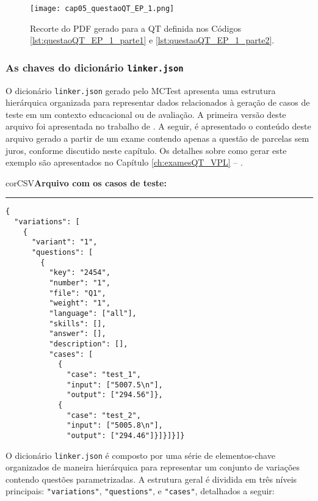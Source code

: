 \begin{figure}[!ht]
  \texttt{[image: cap05\_questaoQT\_EP\_1.png]}
  \caption{Recorte do PDF gerado para a QT definida nos Códigos \ref{lst:questaoQT_EP_1_parte1} e \ref{lst:questaoQT_EP_1_parte2}.}
  \label{fig:cap05_questaoQT_EP_1}
\end{figure}

\subsubsection{As chaves do dicionário \texttt{linker.json}} 


O dicionário \verb|linker.json| gerado pelo MCTest apresenta uma estrutura hierárquica organizada para representar dados relacionados à geração de casos de teste em um contexto educacional ou de avaliação. A primeira versão deste arquivo foi apresentada no trabalho de . A seguir, é apresentado o conteúdo deste arquivo gerado a partir de um exame contendo apenas a questão de parcelas sem juros, conforme discutido neste capítulo. Os detalhes sobre como gerar este exemplo são apresentados no Capítulo \ref{ch:examesQT_VPL} -- .

\begin{myboxCode}{corCSV}{\textbf{Arquivo com os casos de teste:}}\vspace{3mm}
    \hrule
    \begin{verbatim}
{
  "variations": [
    {
      "variant": "1",
      "questions": [
        {
          "key": "2454",
          "number": "1",
          "file": "Q1",
          "weight": "1",
          "language": ["all"],
          "skills": [],
          "answer": [],
          "description": [],
          "cases": [
            {
              "case": "test_1",
              "input": ["5007.5\n"],
              "output": ["294.56"]},
            {
              "case": "test_2",
              "input": ["5005.8\n"],
              "output": ["294.46"]}]}]}]}
\end{verbatim}
\end{myboxCode}


O dicionário \verb|linker.json| é composto por uma série de elementos-chave organizados de maneira hierárquica para representar um conjunto de variações contendo questões parametrizadas. A estrutura geral é dividida em três níveis principais: \verb|"variations"|, \verb|"questions"|, e \verb|"cases"|, detalhados a seguir:

